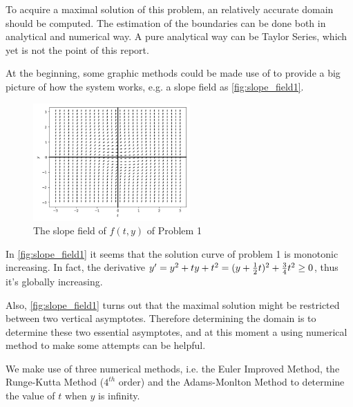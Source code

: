 \documentclass[a4paper]{article}
\begin{document}
	To acquire a maximal solution of this problem, an relatively accurate domain should be computed. The estimation of the boundaries can be done both in analytical and numerical way. A pure analytical way can be Taylor Series, which yet is not the point of this report.
	
	At the beginning, some graphic methods could be made use of to provide a big picture of how the system works, e.g. a slope field as \autoref{fig:slope_field1}.
	
	\begin{figure}[H]
		\centering
		\includegraphics[width=6cm]{img/slope_field1.png}
		\caption{\label{fig:slope_field1} The slope field of $f(t, y)$ of Problem 1}
	\end{figure}
	
	In \autoref{fig:slope_field1} it seems that the solution curve of problem 1 is monotonic increasing. In fact, the derivative $y' = y^2 + ty + t^2 = (y + {1 \over 2}t)^2 + {3 \over 4}t^2 \geq 0$, thus it's globally increasing.
	
	Also, \autoref{fig:slope_field1} turns out that the maximal solution might be restricted between two vertical asymptotes. Therefore determining the domain is to determine these two essential asymptotes, and at this moment a using numerical method to make some attempts can be helpful.
	
	We make use of three numerical methods, i.e. the Euler Improved Method, the Runge-Kutta Method ($4^{th}$ order) and the Adams-Monlton Method to determine the value of $t$ when $y$ is infinity.
	
\end{document}
